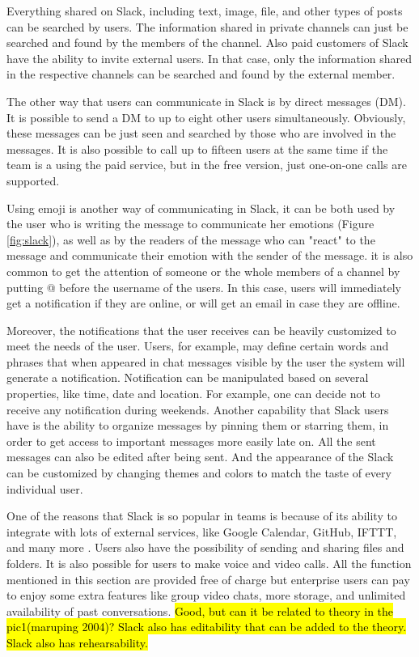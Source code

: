 Everything shared on Slack, including text, image, file, and other types of posts can be searched by users. The information shared in private channels can just be searched and found by the members of the channel. Also paid customers of Slack have the ability to invite external users. In that case, only the information shared in the respective channels can be searched and found by the external member.

The other way that users can communicate in Slack is by direct messages (DM). It is possible to send a DM to up to eight other users simultaneously. Obviously, these messages can be just seen and searched by those who are involved in the messages. It is also possible to call up to fifteen users at the same time if the team is a using the paid service, but in the free version, just one-on-one calls are supported. 

Using emoji is another way of communicating in Slack, it can be both used by the user who is writing the message to communicate her emotions (Figure \ref{fig:slack}), as well as by the readers of the message who can "react" to the message and communicate their emotion with the sender of the message. it is also common to get the attention of someone or the whole members of a channel by putting @ before the username of the users. In this case, users will immediately get a notification if they are online, or will get an email in case they are offline.

Moreover, the notifications that the user receives can be heavily customized to meet the needs of the user. Users, for example, may define certain words and phrases that when appeared in chat messages visible by the user the system will generate a notification. Notification can be manipulated based on several properties, like time, date and location. For example, one can decide not to receive any notification during weekends. Another capability that Slack users have is the ability to organize messages by pinning them or starring them, in order to get access to important messages more easily late on. All the sent messages can also be edited after being sent. And the appearance of the Slack can be customized by changing themes and colors to match the taste of every individual user. 

One of the reasons that Slack is so popular in teams is because of its ability to integrate with lots of external services, like Google Calendar, GitHub, IFTTT, and many more \citep{Williams2015}. Users also have the possibility of sending and sharing files and folders. It is also possible for users to make voice and video calls. All the function mentioned in this section are provided free of charge but enterprise users can pay to enjoy some extra features like group video chats, more storage, and unlimited availability of past conversations. \hl{Good, but can it be related to theory in the pic1(maruping 2004)? Slack also has editability that can be added to the theory. Slack also has rehearsability.}
